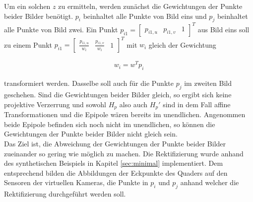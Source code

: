 
%
%

Um ein solchen $z$ zu ermitteln, werden zunächst die Gewichtungen der Punkte beider Bilder benötigt. $p_i$ beinhaltet alle Punkte von Bild eins und $p_j$ beinhaltet alle Punkte von Bild zwei. Ein Punkt  $p_{i1} = \begin{bmatrix}p_{i1,u}&p_{i1,v}&1\end{bmatrix}^T$ aus Bild eins soll zu einem Punkt $p_{i1} = \begin{bmatrix}\frac{p_{i1,u}}{w_i}&\frac{p_{i1,v}}{w_i}&1\end{bmatrix}^T$ mit $w_i$ gleich der Gewichtung 

\begin{gather}
	w_i=w^Tp_i
\end{gather} 

transformiert werden. Dasselbe soll auch für die Punkte $p_j$ im zweiten Bild geschehen. Sind die Gewichtungen beider Bilder gleich, so ergibt sich keine projektive Verzerrung und sowohl $H_p$ also auch $H_p'$ sind in dem Fall affine Transformationen und die Epipole wären bereits im unendlichen. Angenommen beide Epipole befinden sich noch nicht im unendlichen, so können die Gewichtungen der Punkte beider Bilder nicht gleich sein\cite{ZZ}.\\

Das Ziel ist, die Abweichung der Gewichtungen der Punkte beider Bilder zueinander so gering wie möglich zu machen. Die Rektifizierung wurde anhand des synthetischen Beispiels in Kapitel \ref{sec:minimal} implementiert. Dem entsprechend bilden die Abbildungen der Eckpunkte des Quaders auf den Sensoren der virtuellen Kameras, die Punkte in $p_i$ und $p_j$ anhand welcher die Rektifizierung durchgeführt werden soll. \\

